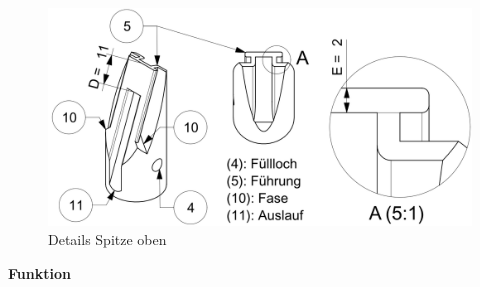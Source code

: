 	\begin{figure}[H]
	\includegraphics[scale=0.42]{Illustrationen/6-Umsetzung/details_spitze_oben.PNG}
	\caption{Details Spitze oben}
	\label{fig:details_spitze_oben}
	\end{figure}

\textbf{Funktion}